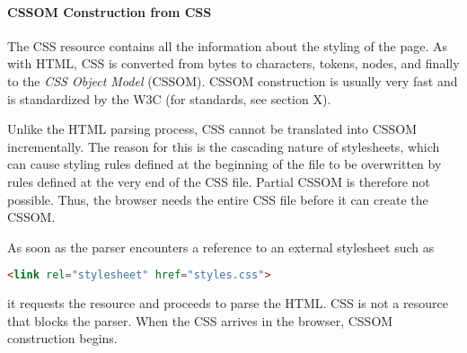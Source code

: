 

\paragraph{CSSOM Construction from CSS} %


The CSS resource contains all the information about the styling of the page.
As with HTML, CSS is converted from bytes to characters, tokens, nodes, and finally to the \textit{CSS Object Model} (CSSOM). %
CSSOM construction is usually very fast %
and is standardized by the W3C (for standards, see section X).%




Unlike the HTML parsing process, CSS cannot be translated into CSSOM incrementally.
The reason for this is the cascading nature of stylesheets, which can cause styling rules defined at the beginning of the file to be overwritten by rules defined at the very end of the CSS file.
Partial CSSOM is therefore not possible.
Thus, the browser needs the entire CSS file before it can create the CSSOM. %



As soon as the parser encounters a reference to an external stylesheet such as

\begin{lstlisting}[language=html, numbers=none]
<link rel="stylesheet" href="styles.css">
\end{lstlisting}

it requests the resource and proceeds to parse the HTML.
CSS is not a resource that blocks the parser.
When the CSS arrives in the browser, CSSOM construction begins.



